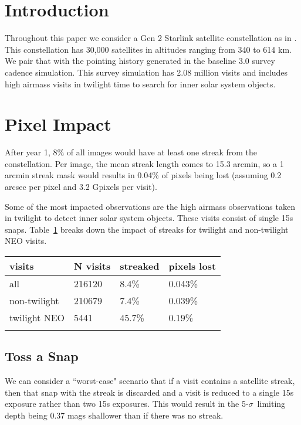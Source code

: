 \section{Introduction}

Throughout this paper we consider a Gen 2 Starlink satellite constellation as in \citet{Hu2022}. This constellation has 30,000 satellites in altitudes ranging from 340 to 614 km. We pair that with the pointing history generated in the baseline 3.0 survey cadence simulation. This survey simulation has 2.08 million visits and includes high airmass visits in twilight time to search for inner solar system objects.




\section{Pixel Impact}

After year 1, 8\% of all images would have at least one streak from the constellation. Per image, the mean streak length comes to 15.3 arcmin, so a 1 arcmin streak mask would results in 0.04\% of pixels being lost (assuming 0.2 arcsec per pixel and 3.2 Gpixels per visit).

Some of the most impacted observations are the high airmass observations taken in twilight to detect inner solar system objects. These visits consist of single 15s snaps. Table~\ref{table:pixel} breaks down the impact of streaks for twilight and non-twilight NEO visits. 

\begin{table}
\begin{tabular}{ l  l  l l}
  visits & N visits & streaked & pixels lost \\
  \hline			
  all & 216120 & 8.4\%  & 0.043\% \\
  non-twilight & 210679 & 7.4\% &  0.039\% \\
  twilight NEO & 5441 & 45.7\% & 0.19\% \\
  \hline  
  \label{table:pixel}
\end{tabular}
\end{table}


\subsection{Toss a Snap}

We can consider a ``worst-case" scenario that if a visit contains a satellite streak, then that snap with the streak is discarded and a visit is reduced to a single 15s exposure rather than two 15s exposures. This would result in the 5-$\sigma$\ limiting depth being 0.37 mags shallower than if there was no streak.

